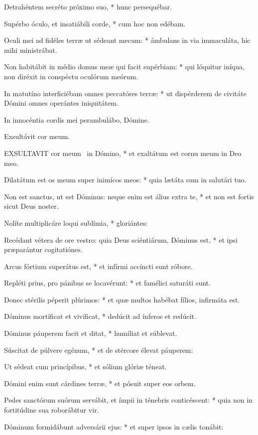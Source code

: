Detrahéntem secréto próximo suo, * hunc persequébar.

Supérbo óculo, et insatiábili corde, * cum hoc non edébam.

Oculi mei ad fidéles terræ ut sédeant mecum: * ámbulans in via immaculáta, hic mihi ministrábat.

Non habitábit in médio domus meæ qui facit supérbiam: * qui lóquitur iníqua, non diréxit in conspéctu oculórum meórum.

In matutíno interficiébam omnes peccatóres terræ: * ut dispérderem de civitáte Dómini omnes operántes iniquitátem.

 In innocéntia cordis mei perambulábo, Dómine.

 Exsultávit cor meum. \textdagger


\lettrine[lines=2]{E}{XSULTAVIT} cor meum \textdagger\ in Dómino, * et exaltátum est cornu meum in Deo meo.

Dilatátum est os meum super inimícos meos: * quia lætáta sum in salutári tuo.

Non est sanctus, ut est Dóminus: neque enim est álius extra te, * et non est fortis sicut Deus noster.

Nolíte multiplicáre loqui sublímia, * gloriántes:

Recédant vétera de ore vestro: quia Deus sciéntiárum, Dóminus est, * et ipsi præparántur cogitatiónes.

Arcus fórtium superátus est, * et infírmi accíncti sunt róbore.

Repléti prius, pro pánibus se locavérunt: * et famélici saturáti sunt.

Donec stérilis péperit plúrimos: * et quæ multos habébat fílios, infirmáta est.

Dóminus mortíficat et vivíficat, * dedúcit ad ínferos et redúcit.

Dóminus páuperem facit et ditat, * humíliat et súblevat.

Súscitat de púlvere egénum, * et de stércore élevat páuperem:

Ut sédeat cum princípibus, * et sólium glóriæ téneat.

Dómini enim sunt cárdines terræ, * et pósuit super eos orbem.

Pedes sanctórum suórum servábit, et ímpii in ténebris conticéscent: * quia non in fortitúdine sua roborábitur vir.

Dóminum formidábunt adversárii ejus: * et super ipsos in cælis tonábit:

